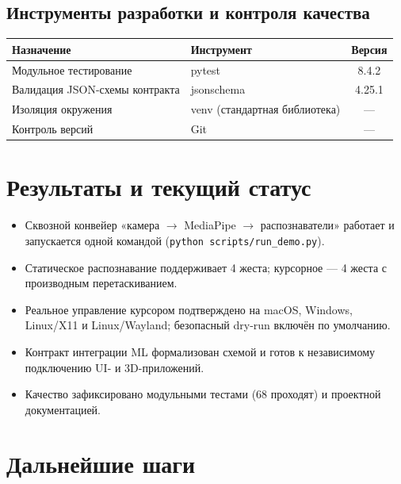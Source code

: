 \documentclass[11pt,a4paper]{article}
\begin{document}
\subsection{Инструменты разработки и контроля качества}

\begin{center}
\begin{tabular}{l >{\ttfamily}l c}
\toprule
\textbf{Назначение} & \normalfont\textbf{Инструмент} & \textbf{Версия} \\
\midrule
Модульное тестирование        & pytest      & 8.4.2 \\
Валидация JSON-схемы контракта & jsonschema  & 4.25.1 \\
Изоляция окружения            & \normalfont venv (стандартная библиотека) & --- \\
Контроль версий               & \normalfont Git & --- \\
\bottomrule
\end{tabular}
\end{center}

\section{Результаты и текущий статус}

\begin{itemize}[leftmargin=1.4em]
  \item Сквозной конвейер «камера $\rightarrow$ MediaPipe $\rightarrow$ распознаватели» работает и
        запускается одной командой (\texttt{python scripts/run\_demo.py}).
  \item Статическое распознавание поддерживает 4 жеста; курсорное — 4 жеста с производным
        перетаскиванием.
  \item Реальное управление курсором подтверждено на macOS, Windows, Linux/X11 и
        Linux/Wayland; безопасный dry-run включён по умолчанию.
  \item Контракт интеграции ML формализован схемой и готов к независимому подключению UI- и
        3D-приложений.
  \item Качество зафиксировано модульными тестами (68 проходят) и проектной документацией.
\end{itemize}

\section{Дальнейшие шаги}
\end{document}
